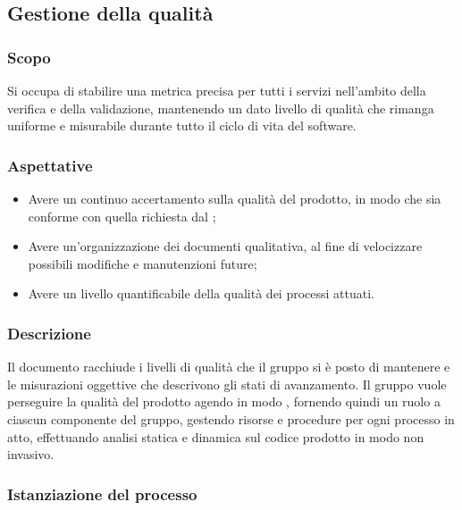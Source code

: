 \subsection{Gestione della qualità}
\subsubsection{Scopo}
Si occupa di stabilire una metrica precisa per tutti i servizi nell’ambito della verifica e della validazione, mantenendo un dato livello di qualità che rimanga uniforme e misurabile durante tutto il ciclo di vita del software.

\subsubsection{Aspettative}
\begin{itemize}
	\item Avere un continuo accertamento sulla qualità del prodotto, in modo che sia conforme con quella richiesta dal ;
	\item Avere un'organizzazione dei documenti qualitativa, al fine di velocizzare possibili modifiche e manutenzioni future;
	\item Avere un livello quantificabile della qualità dei processi attuati.
\end{itemize}

\subsubsection{Descrizione}
Il documento  racchiude i livelli di qualità che il gruppo si è posto di mantenere e le misurazioni oggettive che descrivono gli stati di avanzamento.
Il gruppo vuole perseguire la qualità del prodotto agendo in modo , fornendo quindi un ruolo a ciascun componente del gruppo, gestendo risorse e procedure per ogni processo in atto, effettuando analisi statica e dinamica sul codice prodotto in modo non invasivo.
\subsubsection{Istanziazione del processo}
